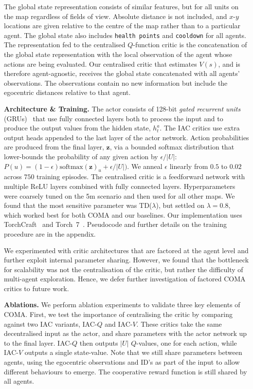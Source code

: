 \documentclass[letterpaper]{article}
\newcommand{\citep}{\cite}
\newcommand{\myvec}[1]{\mathbf{#1}}
\newcommand{\vz}{\myvec{z}}
\newcommand{\mysoftmax}[1]{{\ensuremath{\text{softmax}(#1)}}}
\begin{document}
The global state representation consists of similar features, but for
all units on the map regardless of fields of view. Absolute distance is not 
included, and $x$-$y$ locations are given relative to the centre of the map 
rather than to a particular agent. The global state also includes 
\texttt{health points} and \texttt{cooldown} for all agents. The representation 
fed
to the centralised $Q$-function critic is the concatenation of the global state 
representation with the 
local observation of the agent whose actions are being evaluated. Our 
centralised critic that estimates $V(s)$, 
and is therefore agent-agnostic, receives the global state concatenated with 
all agents' observations. The observations contain no new information but 
include the egocentric distances relative to that agent.

\textbf{Architecture \& Training.}
\label{ssec:architecture} 
The actor consists of 128-bit \emph{gated recurrent units} 
(GRUs)~\citep{cho2014properties} that use fully connected layers both to 
process the input and to produce the output values from the hidden state, 
$h^a_t$. The IAC critics use extra output heads appended to the last layer of 
the actor network. Action probabilities are produced from the final layer, 
$\vz$, via a bounded softmax distribution that lower-bounds the probability of 
any given action by $\epsilon / |U|$:  $P(u) = (1- \epsilon) \mysoftmax{\vz}_u 
+  \epsilon / |U|)$. We anneal $\epsilon$ linearly from $0.5$ to $0.02$ across 
$750$ training episodes. The centralised critic is a feedforward network with 
multiple ReLU layers combined with fully connected layers.  Hyperparameters 
were coarsely tuned on the 5m scenario and then used for all other 
maps. We found that the most sensitive parameter was TD($\lambda$), but settled 
on $\lambda=0.8$, which worked best for both COMA 
and our baselines. Our implementation uses 
TorchCraft~\citep{synnaeve2016torchcraft} and \mbox{Torch 7}~\citep{torch}. Pseudocode and
further details on the training procedure are in the 
appendix.

We experimented with critic architectures that are factored at the agent level and 
further exploit internal parameter sharing. However, we found that the 
bottleneck for scalability was not the centralisation of the critic, but rather 
the difficulty of multi-agent exploration.  Hence, we defer further 
investigation of factored COMA critics to future work.

\textbf{Ablations.}
We perform ablation experiments to validate three key elements of COMA. First, 
we test the importance of centralising the critic by comparing 
against two IAC variants, IAC-$Q$ and IAC-$V$. These critics take the same 
decentralised input as the actor, and share parameters with the actor network 
up to the final layer. IAC-$Q$ then outputs $\vert U \vert$ $Q$-values, one for 
each action, while IAC-$V$ outputs a single state-value. Note that we still 
share parameters between agents, using the egocentric observations and ID's as 
part of the input to allow different behaviours to emerge. The cooperative 
reward function is still shared by all agents.
\end{document}
